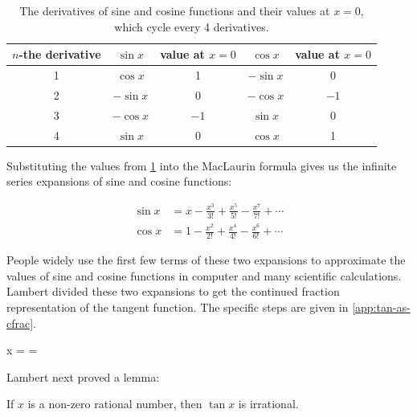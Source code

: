 \documentclass[b5paper]{article}
\begin{document}
\begin{table}[htbp]
  \centering
  \begin{tabular}{|c|c|c||c|c|}
    \hline
    $n$-the derivative & $\sin x$ & value at $x = 0$ & $\cos x$ & value at $x = 0$ \\
    \hline
    1 & $\cos x$  & 1  & $-\sin x$ & 0 \\
    \hline
    2 & $-\sin x$ & 0  & $-\cos x$ & $-1$ \\
    \hline
    3 & $-\cos x$ & $-1$ & $\sin x$  & 0 \\
    \hline
    4 & $\sin x$  & 0  & $\cos x$  & 1 \\
    \hline
  \end{tabular}
  \caption{The derivatives of sine and cosine functions and their values at $x = 0$, which cycle every 4 derivatives. \label{tab:sin-cos-derivatives}}
\end{table}

Substituting the values from \cref{tab:sin-cos-derivatives} into the MacLaurin formula gives us the infinite series expansions of sine and cosine functions:

\begin{align}
\sin x &= x - \frac{x^3}{3!} + \frac{x^5}{5!} - \frac{x^7}{7!} + \dotsb \\
\cos x &= 1 - \frac{x^2}{2!} + \frac{x^4}{4!} - \frac{x^6}{6!} + \dotsb
\end{align}

People widely use the first few terms of these two expansions to approximate the values of sine and cosine functions in computer and many scientific calculations. Lambert divided these two expansions to get the continued fraction representation of the tangent function. The specific steps are given in \cref{app:tan-as-cfrac}.

\be
\tan x =  = 
\ee

Lambert next proved a lemma:

\begin{lemma}
If $x$ is a non-zero rational number, then $\tan x$ is irrational.
\end{lemma}
\end{document}
